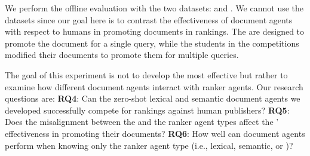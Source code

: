 We perform the offline evaluation with the two \single\xspace datasets: \GregDataset and \NivDataset. We cannot use the \multi datasets since our goal here is to contrast the effectiveness of document agents with respect to humans in promoting documents in rankings. The \botagents are designed to promote the document for a single query, while the students in the \multi competitions modified their documents to promote them for multiple queries. 

The goal of this experiment is not to develop the most effective \botagent but rather to examine how different document agents interact with ranker agents. 
Our research questions are:
\textbf{RQ4}: Can the zero-shot lexical and semantic document agents we developed successfully compete for rankings against human publishers?
\textbf{RQ5}: Does the misalignment between the \botagent and the ranker agent types affect the \botagents' effectiveness in promoting their documents? 
\textbf{RQ6}: How well can document agents perform when knowing only the ranker agent type (i.e., lexical, semantic, or \llm)?
